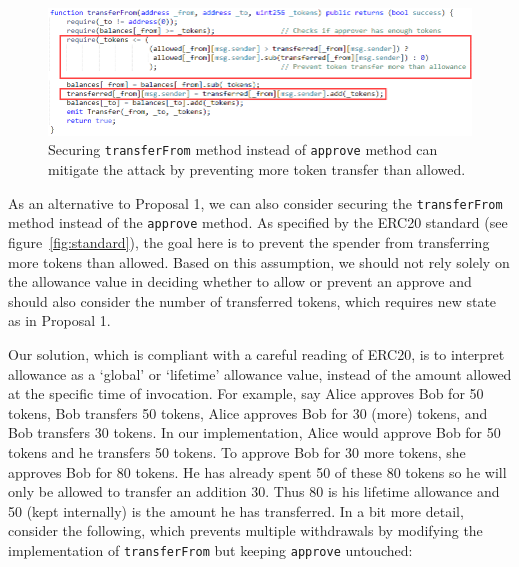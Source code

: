 \begin{figure}[t]
	\centering
	\includegraphics[width=1.0\linewidth]{figures/multiple_withdrawal_31.png}
	\caption{Securing \texttt{transferFrom} method instead of \texttt{approve} method can mitigate the attack by preventing more token transfer than allowed.\label{fig:transfer2}}
\end{figure}


As an alternative to Proposal 1, we can also consider securing the \texttt{transferFrom} method instead of the \texttt{approve} method. As specified by the ERC20 standard (see figure~\ref{fig:standard}), the goal here is to prevent the spender from transferring more tokens than allowed. Based on this assumption, we should not rely solely on the allowance value in deciding whether to allow or prevent an approve and should also consider the number of transferred tokens, which requires new state as in Proposal 1. 

Our solution, which is compliant with a careful reading of ERC20, is to interpret allowance as a `global' or `lifetime' allowance value, instead of the amount allowed at the specific time of invocation. For example, say Alice approves Bob for 50 tokens, Bob transfers 50 tokens, Alice approves Bob for 30 (more) tokens, and Bob transfers 30 tokens. In our implementation, Alice would approve Bob for 50 tokens and he transfers 50 tokens. To approve Bob for 30 more tokens, she approves Bob for 80 tokens. He has already spent 50 of these 80 tokens so he will only be allowed to transfer an addition 30. Thus 80 is his lifetime allowance and 50 (kept internally) is the amount he has transferred. In a bit more detail, consider the following, which prevents multiple withdrawals by modifying the implementation of \texttt{transferFrom} but keeping \texttt{approve} untouched:

